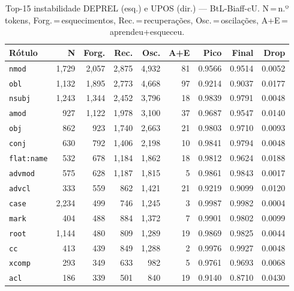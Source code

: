 

\begin{table}[ht]
\centering
\caption{Top-15 instabilidade DEPREL (esq.) e UPOS (dir.) --- BtL-Biaff-cU. N\,=\,n.º tokens, Forg.\,=\,esquecimentos, Rec.\,=\,recuperações, Osc.\,=\,oscilações, A+E\,=\,aprendeu+esqueceu.}
\label{tab:inst-predictions-results-bertimbau-large-biaffine}
\begin{minipage}[t]{0.54\linewidth}
\centering\tiny
\begin{tabular}{lrrrrrrrr}
\toprule
\textbf{Rótulo} & \textbf{N} & \textbf{Forg.} & \textbf{Rec.} & \textbf{Osc.} & \textbf{A+E} & \textbf{Pico} & \textbf{Final} & \textbf{Drop} \\
\midrule
\texttt{nmod} & 1,729 & 2,057 & 2,875 & 4,932 & 81 & 0.9566 & 0.9514 & 0.0052 \\
\texttt{obl} & 1,132 & 1,895 & 2,773 & 4,668 & 97 & 0.9214 & 0.9037 & 0.0177 \\
\texttt{nsubj} & 1,243 & 1,344 & 2,452 & 3,796 & 18 & 0.9839 & 0.9791 & 0.0048 \\
\texttt{amod} & 927 & 1,122 & 1,978 & 3,100 & 37 & 0.9687 & 0.9547 & 0.0140 \\
\texttt{obj} & 862 & 923 & 1,740 & 2,663 & 21 & 0.9803 & 0.9710 & 0.0093 \\
\texttt{conj} & 630 & 792 & 1,406 & 2,198 & 10 & 0.9841 & 0.9794 & 0.0048 \\
\texttt{flat\!:\!name} & 532 & 678 & 1,184 & 1,862 & 18 & 0.9812 & 0.9624 & 0.0188 \\
\texttt{advmod} & 575 & 628 & 1,187 & 1,815 & 5 & 0.9861 & 0.9843 & 0.0017 \\
\texttt{advcl} & 333 & 559 & 862 & 1,421 & 21 & 0.9219 & 0.9099 & 0.0120 \\
\texttt{case} & 2,234 & 499 & 746 & 1,245 & 3 & 0.9987 & 0.9982 & 0.0004 \\
\texttt{mark} & 404 & 488 & 884 & 1,372 & 7 & 0.9901 & 0.9802 & 0.0099 \\
\texttt{root} & 1,144 & 480 & 809 & 1,289 & 19 & 0.9869 & 0.9825 & 0.0044 \\
\texttt{cc} & 413 & 439 & 849 & 1,288 & 2 & 0.9976 & 0.9927 & 0.0048 \\
\texttt{xcomp} & 293 & 349 & 633 & 982 & 5 & 0.9761 & 0.9693 & 0.0068 \\
\texttt{acl} & 186 & 339 & 501 & 840 & 19 & 0.9140 & 0.8710 & 0.0430 \\
\bottomrule
\end{tabular}

\end{minipage}
\end{table}
